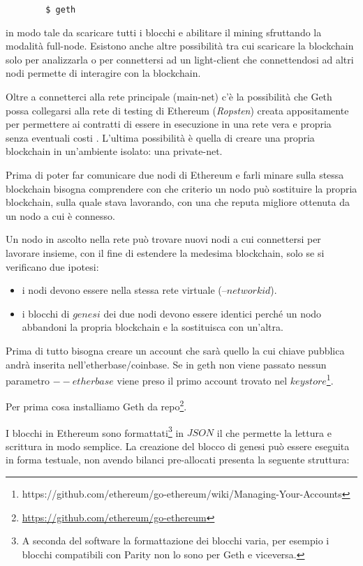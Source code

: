 \begin{appendices}
		\begin{lstlisting}
		$ geth
		\end{lstlisting}
		
		in modo tale da scaricare tutti i blocchi e abilitare il mining sfruttando la modalità full-node. Esistono anche altre possibilità tra cui scaricare la blockchain solo per analizzarla o per connettersi ad un light-client che connettendosi ad altri nodi permette di interagire con la blockchain.
		
		Oltre a connetterci alla rete principale (main-net) c'è la possibilità che Geth possa collegarsi alla rete di testing di Ethereum (\textit{Ropsten}) creata appositamente per permettere ai contratti di essere in esecuzione in una rete vera e propria senza eventuali costi .
		L'ultima possibilità è quella di creare una propria blockchain in un'ambiente isolato: una private-net.
		
		Prima di poter far comunicare due nodi di Ethereum e farli minare sulla stessa blockchain bisogna comprendere con che criterio un nodo può sostituire la propria blockchain, sulla quale stava lavorando, con una che reputa migliore ottenuta da un nodo a cui è connesso.
		
		Un nodo in ascolto nella rete può trovare nuovi nodi a cui connettersi per lavorare insieme, con il fine di estendere la medesima blockchain, solo se si verificano due ipotesi:
		\begin{itemize}
			\item i nodi devono essere nella stessa rete virtuale (--$networkid$).
			\item i blocchi di $genesi$ dei due nodi devono essere identici perché un nodo abbandoni la propria blockchain e la sostituisca con un'altra.
		\end{itemize}
		
		Prima di tutto bisogna creare un account che sarà quello la cui chiave pubblica andrà inserita nell'etherbase/coinbase. Se in geth non viene passato nessun parametro $--etherbase$ viene preso il primo account trovato nel $keystore$\footnote{https://github.com/ethereum/go-ethereum/wiki/Managing-Your-Accounts}.	
		
		Per prima cosa installiamo Geth da repo\footnote{\url{https://github.com/ethereum/go-ethereum}}.
		
		I blocchi in Ethereum sono formattati\footnote{A seconda del software la formattazione dei blocchi varia, per esempio i blocchi compatibili con Parity non lo sono per Geth e viceversa.} in $JSON$ il che permette la lettura e scrittura in modo semplice. La creazione del blocco di genesi può essere eseguita in forma testuale, non avendo bilanci pre-allocati presenta la seguente struttura:
		

\end{appendices}

